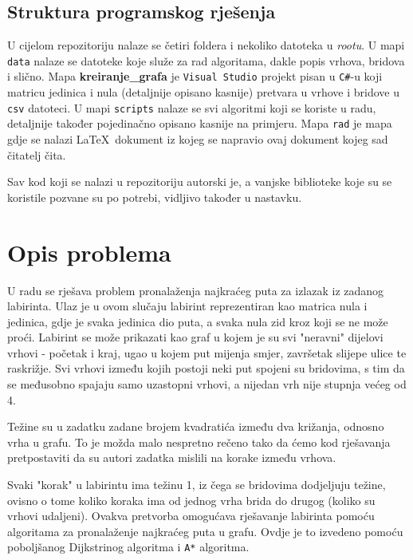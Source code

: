 \documentclass[11pt]{article}
\let\Oldlatex\LaTeX
\renewcommand{\LaTeX}{\textrm{\Oldlatex}}
\begin{document}
\subsection{Struktura programskog rješenja}

U cijelom repozitoriju nalaze se četiri foldera i nekoliko datoteka u
\textit{rootu}. U mapi \texttt{data} nalaze se datoteke koje služe za rad
algoritama, dakle popis vrhova, bridova i slično.
Mapa \textbf{kreiranje\_grafa} je \texttt{Visual Studio} projekt pisan u
\texttt{C\#}-u koji matricu jedinica i nula (detaljnije opisano kasnije)
pretvara u vrhove i bridove u \texttt{csv} datoteci.
U mapi \texttt{scripts} nalaze se svi algoritmi koji se koriste u radu,
detaljnije također pojedinačno opisano kasnije na primjeru.
Mapa \texttt{rad} je mapa gdje se nalazi \LaTeX\ dokument iz kojeg se
napravio ovaj dokument kojeg sad čitatelj čita.

Sav kod koji se nalazi u repozitoriju autorski je, a vanjske biblioteke koje su
se koristile pozvane su po potrebi, vidljivo također u nastavku.

	\section{Opis problema}
	U radu se rješava problem pronalaženja najkraćeg puta za izlazak iz zadanog labirinta. Ulaz je u ovom slučaju labirint reprezentiran kao matrica nula i jedinica, gdje je svaka jedinica dio puta, a svaka nula zid kroz koji se ne može proći. Labirint se može prikazati kao graf u kojem je su svi "neravni" dijelovi vrhovi - početak i kraj, ugao u kojem put mijenja smjer, završetak slijepe ulice te raskrižje. Svi vrhovi između kojih postoji neki put spojeni su bridovima, s tim da se međusobno spajaju samo uzastopni vrhovi, a nijedan vrh nije stupnja većeg od 4.

	Težine su u zadatku zadane brojem kvadratića između dva križanja, odnosno vrha u grafu. To je možda malo nespretno rečeno tako da ćemo kod rješavanja pretpostaviti da su autori zadatka mislili na korake između vrhova.

	Svaki "korak" u labirintu ima težinu 1, iz čega se bridovima dodjeljuju težine, ovisno o tome koliko koraka ima od jednog vrha brida do drugog (koliko su vrhovi udaljeni). Ovakva pretvorba omogućava rješavanje labirinta pomoću algoritama za pronalaženje najkraćeg puta u grafu. Ovdje je to izvedeno pomoću poboljšanog Dijkstrinog algoritma i \texttt{A*} algoritma.
\end{document}
